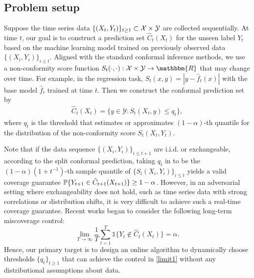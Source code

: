 \subsection{Problem setup}
\vspace{-0.5em}
Suppose the time series data $\{(X_t,Y_t)\}_{t\geq 1} \subset {\mathcal{X}}\times {\mathcal{Y}}$ are collected sequentially. At time $t$, our goal is to construct a prediction set $\hat{C}_t(X_t)$ for the unseen label $Y_t$ based on the machine learning model trained on previously observed data $\{(X_i,Y_i)\}_{i\leq t}$. 
Aligned with the standard conformal inference methods, we use a non-conformity score function $S_t(\cdot,\cdot): \mathcal{X}\times \mathcal{Y} \to \mathbbm{R}$ that may change over time. For example, in the regression task, $S_t(x,y) = |y-\hat{f}_t(x)|$ with the base model $\hat{f}_t$ trained at time $t$. Then we construct the conformal prediction set by
\begin{align}\label{eq:online_PI}
    \hat{C}_t(X_t)=\{y \in \mathcal{Y}: S_t(X_t,y) \leq q_t\},
\end{align}
where $q_t$ is the threshold that estimates or approximates $(1-\alpha)$-th quantile for the distribution of the non-conformity score $S_t(X_t, Y_t)$.

Note that if the data sequence $\{(X_i,Y_i)\}_{i\leq t+1}$ are i.i.d. or exchangeable, according to the split conformal prediction, taking $q_t$ in  to be the $(1-\alpha)(1+t^{-1})$-th sample quantile of $\{S_i(X_i,Y_i)\}_{i\leq t}$ yields a valid coverage guarantee ${\mathbb{P}}\{Y_{t+1} \in \hat{C}_{t+1}(X_{t+1})\}\geq 1-\alpha$. However, in an adversarial setting where exchangeability does not hold, such as time series data with strong correlations or distribution shifts, it is very difficult to achieve such a real-time coverage guarantee. Recent works \citep{bhatnagar2023improved,angelopoulos2023prediction,angelopoulos2024online,podkopaevadaptive} began to consider the following long-term miscoverage control:
\begin{equation}
    \lim_{T \to \infty} \frac{1}{T}\sum_{t=1}^T\mathds{1}\{ Y_t \notin \hat{C}_t(X_t)\}=\alpha.
    \label{limit1}
\end{equation}
Hence, our primary target is to design an online algorithm to dynamically choose thresholds $\{q_t\}_{t\geq 1}$ that can achieve the control in \eqref{limit1} without any distributional assumptions about data.
